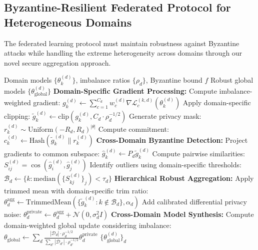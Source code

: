 \documentclass[12pt,a4paper]{article}
\theoremstyle{definition}
\newcommand{\D}{\mathcal{D}}
\newcommand{\B}{\mathcal{B}}
\newcommand{\N}{\mathcal{N}}
\begin{document}
\subsection{Byzantine-Resilient Federated Protocol for Heterogeneous Domains}

The federated learning protocol must maintain robustness against Byzantine attacks while handling the extreme heterogeneity across domains through our novel secure aggregation approach.

\begin{algorithm}
\caption{ICS3D Byzantine-Resilient Secure Aggregation}
\label{alg:secure_aggregation}
\begin{algorithmic}[1]
\Require Domain models $\{\theta_k^{(d)}\}$, imbalance ratios $\{\rho_d\}$, Byzantine bound $f$
\Ensure Robust global models $\{\theta_{\text{global}}^{(d)}\}$
\State \textbf{Domain-Specific Gradient Processing:}
    \For{each client $k \in \D_d$}
        \State Compute imbalance-weighted gradient:
        \State $g_k^{(d)} \leftarrow \sum_{c=1}^{C_d} w_c^{(d)} \nabla\mathcal{L}_c^{(k,d)}(\theta_k^{(d)})$
        \State Apply domain-specific clipping:
        \State $\tilde{g}_k^{(d)} \leftarrow \text{clip}(g_k^{(d)}, C_d \cdot \rho_d^{-1/2})$
        \State Generate privacy mask: $r_k^{(d)} \sim \text{Uniform}(-R_d, R_d)^{|\theta|}$
        \State Compute commitment: $c_k^{(d)} \leftarrow \text{Hash}(\tilde{g}_k^{(d)} \| r_k^{(d)})$
    \EndFor
\EndFor
\State \textbf{Cross-Domain Byzantine Detection:}
    \State Project gradients to common subspace: $\hat{g}_k^{(d)} \leftarrow P_d \tilde{g}_k^{(d)}$
    \State Compute pairwise similarities: $S_{ij}^{(d)} = \cos(\hat{g}_i^{(d)}, \hat{g}_j^{(d)})$
    \State Identify outliers using domain-specific thresholds:
    \State $\B_d \leftarrow \{k : \text{median}(\{S_{kj}^{(d)}\}_j) < \tau_d\}$
\EndFor
\State \textbf{Hierarchical Robust Aggregation:}
    \State Apply trimmed mean with domain-specific trim ratio:
    \State $\theta_d^{\text{agg}} \leftarrow \text{TrimmedMean}(\{\tilde{g}_k^{(d)} : k \notin \B_d\}, \alpha_d)$
    \State Add calibrated differential privacy noise:
    \State $\theta_d^{\text{private}} \leftarrow \theta_d^{\text{agg}} + \N(0, \sigma_d^2 I)$
\EndFor
\State \textbf{Cross-Domain Model Synthesis:}
\State Compute domain-weighted global update considering imbalance:
\State $\theta_{\text{global}} \leftarrow \sum_d \frac{|\D_d| \cdot \rho_d^{-1/2}}{\sum_{d'} |\D_{d'}| \cdot \rho_{d'}^{-1/2}} \theta_d^{\text{private}}$
\State \Return $\{\theta_{\text{global}}^{(d)}\}_d$
\end{algorithmic}
\end{algorithm}
\end{document}
